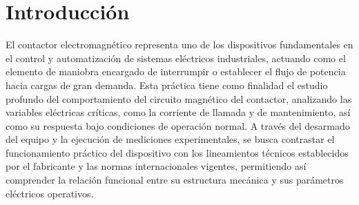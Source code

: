 \section{Introducción}

El contactor electromagnético representa uno de los dispositivos fundamentales en el control y automatización de sistemas eléctricos industriales, actuando como el elemento de maniobra encargado de interrumpir o establecer el flujo de potencia hacia cargas de gran demanda. Esta práctica tiene como finalidad el estudio profundo del comportamiento del circuito magnético del contactor, analizando las variables eléctricas críticas, como la corriente de llamada y de mantenimiento, así como su respuesta bajo condiciones de operación normal. A través del desarmado del equipo y la ejecución de mediciones experimentales, se busca contrastar el funcionamiento práctico del dispositivo con los lineamientos técnicos establecidos por el fabricante y las normas internacionales vigentes, permitiendo así comprender la relación funcional entre su estructura mecánica y sus parámetros eléctricos operativos.